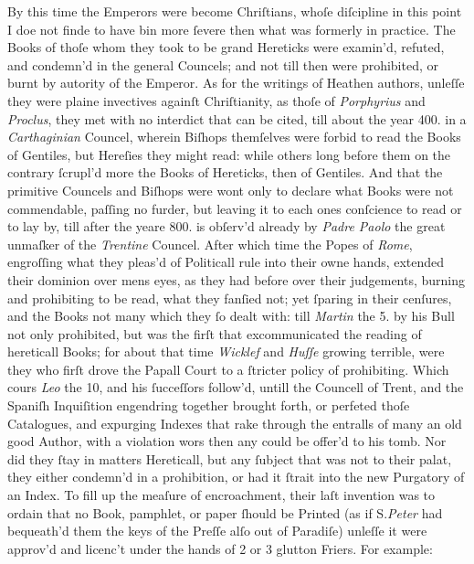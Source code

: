 By this time the Emperors were become Chriſtians, whoſe diſcipline in this point
I doe not finde to have bin more ſevere then what was formerly in practice.  The
Books of thoſe whom they took to be grand Hereticks were examin'd, refuted, and
condemn'd in the general Councels; and not till then were prohibited, or burnt
by autority of the Emperor.  As for the writings of Heathen authors, unleſſe
they were plaine invectives againſt Chriſtianity, as thoſe of
\textit{Porphyrius} and \textit{Proclus}, they met with no interdict that can be
cited, till about the year 400. in a \textit{Carthaginian} Councel, wherein
Biſhops themſelves were forbid to read the Books of Gentiles, but Hereſies they
might read: while others long before them on the contrary ſcrupl'd more the
Books of Hereticks, then of Gentiles.  And that the primitive Councels and
Biſhops were wont only to declare what Books were not commendable, paſſing no
furder, but leaving it to each ones conſcience to read or to lay by, till after
the yeare 800. is obſerv'd already by \textit{Padre Paolo} the great unmaſker of
the \textit{Trentine} Councel.  After which time the Popes of \textit{Rome},
engroſſing what they pleas'd of Politicall rule into their owne hands, extended
their dominion over mens eyes, as they had before over their judgements, burning
and prohibiting to be read, what they fanſied not; yet ſparing in their
cenſures, and the Books not many which they ſo dealt with: till \textit{Martin}
the 5. by his Bull not only prohibited, but was the firſt that excommunicated
the reading of hereticall Books; for about that time \textit{Wicklef} and
\textit{Huſſe} growing terrible, were they who firſt drove the Papall Court to a
ſtricter policy of prohibiting.  Which cours \textit{Leo} the 10, and his
ſucceſſors follow'd, untill the Councell of Trent, and the Spaniſh Inquiſition
engendring together brought forth, or perfeted thoſe Catalogues, and expurging
Indexes that rake through the entralls of many an old good Author, with a
violation wors then any could be offer'd to his tomb.  Nor did they ſtay in
matters Hereticall, but any ſubject that was not to their palat, they either
condemn'd in a prohibition, or had it ſtrait into the new Purgatory of an Index.
To fill up the meaſure of encroachment, their laſt invention was to ordain that
no Book, pamphlet, or paper ſhould be Printed (as if S.\textit{Peter} had
bequeath'd them the keys of the Preſſe alſo out of Paradiſe) unleſſe it were
approv'd and licenc't under the hands of 2 or 3 glutton Friers.  For example:

